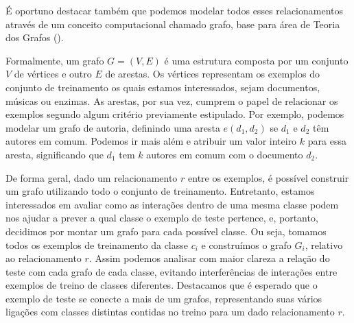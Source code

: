 
É oportuno destacar também que podemos modelar todos esses relacionamentos através de um conceito computacional chamado grafo, base para área de Teoria dos Grafos (\cite{Bondy08}).

Formalmente, um grafo $G = (V,E)$ é uma estrutura composta por um conjunto $V$ de vértices e outro $E$ de arestas. Os vértices representam os exemplos do conjunto de treinamento os quais estamos interessados, sejam documentos, músicas ou enzimas. As arestas, por sua vez, cumprem o papel de relacionar os exemplos segundo algum critério previamente estipulado. Por exemplo, podemos modelar um grafo de autoria, definindo uma aresta $e(d_1,d_2)$ se $d_1$ e $d_2$ têm autores em comum. Podemos ir mais além e atribuir um valor inteiro $k$ para essa aresta, significando que $d_1$ tem $k$ autores em comum com o documento $d_2$.

De forma geral, dado um  relacionamento $r$ entre os exemplos, é possível construir um grafo utilizando todo o conjunto de treinamento. Entretanto, estamos interessados em avaliar como as interações dentro de uma mesma classe podem nos ajudar a prever a qual classe o exemplo de teste pertence, e, portanto, decidimos por montar um grafo para cada possível classe.
Ou seja, tomamos todos os exemplos de treinamento da classe $c_i$ e construímos o grafo $G_i$, relativo ao relacionamento $r$. Assim podemos analisar com maior clareza a relação do teste com cada grafo de cada classe, evitando interferências de interações entre exemplos de treino de classes diferentes. Destacamos que é esperado que o exemplo de teste se conecte a mais de um grafos, representando suas vários ligações com classes distintas contidas no treino para um dado relacionamento $r$.


